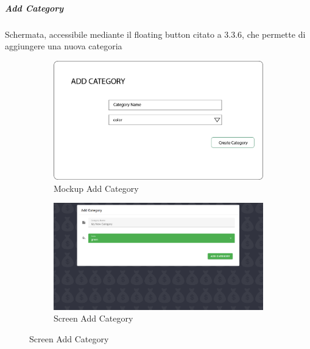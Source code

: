 \documentclass{report}
\begin{document}
\subparagraph{Add Category}
Schermata, accessibile mediante il floating button citato a 3.3.6, che permette di aggiungere una nuova categoria
\begin{figure}[H]
    \begin{subfigure}
        \centering
        \includegraphics[scale=0.3]{images/mockups/Add Category.png}
        \caption{Mockup Add Category}
    \end{subfigure}
    \par\bigskip
    \begin{subfigure}
        \centering
        \includegraphics[scale=0.35]{images/screens/Add Category.png}
        \caption{Screen Add Category}
    \end{subfigure}
\end{figure}
\end{document}
